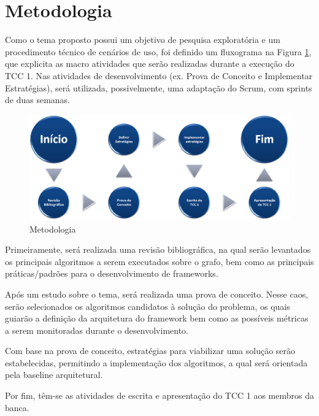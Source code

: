 \newpage
\section*{Metodologia}


Como o tema proposto possui um objetivo de pesquisa exploratória e um procedimento técnico de cenários de uso, foi definido um fluxograma na Figura \ref{Metodologia}, que explicita as macro atividades que serão realizadas durante a execução do TCC 1. Nas atividades de desenvolvimento (ex. Prova de Conceito e Implementar Estratégias), será utilizada, possivelmente, uma adaptação do Scrum, com sprints de duas semanas.

\begin{figure}[!h]
	\centering
	\includegraphics[scale=0.5]{figuras/metodologia.eps}
	\caption{Metodologia}
	\label{Metodologia}
\end{figure}

Primeiramente, será realizada uma revisão bibliográfica, na qual serão levantados os principais algoritmos a serem executados sobre o grafo, bem como as principais práticas/padrões para o desenvolvimento de frameworks.

Após um estudo sobre o tema, será realizada uma prova de conceito. Nesse caos, serão selecionados os algoritmos candidatos à solução do problema, os quais guiarão a definição da arquitetura do framework bem como as possíveis métricas a serem monitoradas durante o desenvolvimento.

Com base na prova de conceito, estratégias para viabilizar uma solução serão estabelecidas, permitindo a implementação dos algoritmos, a qual será orientada pela baseline arquitetural.

Por fim, têm-se as atividades de escrita e apresentação do TCC 1 aos membros da banca.

